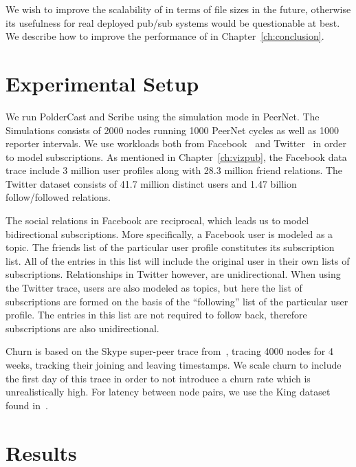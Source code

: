 We wish to improve the scalability of \demo{} in terms of file sizes in
the future, otherwise its usefulness for real deployed pub/sub systems
would be questionable at best. We describe how to improve the
performance of \demo{} in Chapter~\ref{ch:conclusion}.

\section{Experimental Setup}

We run PolderCast and Scribe using the simulation mode in PeerNet. The
Simulations consists of 2000 nodes running 1000 PeerNet cycles as well as 1000 reporter
intervals. We use workloads both from Facebook~\cite{facebook-eurosys09} and
Twitter~\cite{Kwak10www} in order to model subscriptions. As mentioned in
Chapter~\ref{ch:vizpub}, the Facebook data trace include 3 million user
profiles along with 28.3 million friend relations. The Twitter dataset
consists of 41.7 million distinct users and 1.47 billion
follow/followed relations.

The social relations in Facebook are reciprocal, which leads us to model
bidirectional subscriptions. More specifically, a Facebook user is
modeled as a topic. The friends list of the particular user profile
constitutes its subscription list. All of the entries in this list will
include the original user in their own lists of subscriptions.
Relationships in Twitter however, are unidirectional. When using the
Twitter trace, users are also modeled as topics, but here the list of
subscriptions are formed on the basis of the ``following'' list of the
particular  user profile. The entries in this list are not required to
follow back, therefore subscriptions are also unidirectional.

Churn is based on the Skype super-peer trace from~\cite{Guha:2006}, tracing 4000
nodes for 4 weeks, tracking their joining and leaving timestamps. We
scale churn to include the first day of this trace in order to not
introduce a churn rate which is unrealistically high. For latency
between node pairs, we use the King dataset found in~\cite{king}.

\section{Results}


